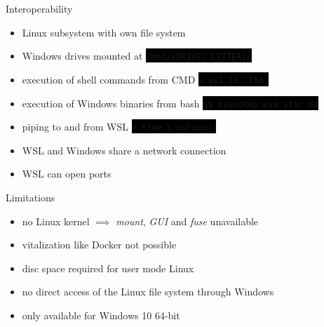 \documentclass[10pt,graphics,aspectratio=169,table]{beamer}
\newcommand{\code}[0]{\lstinline[basicstyle=\ttfamily\color{white}]}
\newcommand{\cbox}[1]{\colorbox{black}{#1}}
\begin{document}
\begin{frame}{Interoperability}
\begin{itemize}
    \item Linux subsystem with own file system
    \item Windows drives mounted at \cbox{\code|/mnt/[DRIVE\_LETTER]/|}
    \item execution of shell commands from CMD \cbox{\code|> wsl ls -lhA |}
    \item execution of Windows binaries from bash \cbox{\code|\$ nslookup.exe ifsr.de|}
    \item piping to and from WSL \cbox{\code|> tree \| wsl more|}
    \item WSL and Windows share a network connection
    \item WSL can open ports
\end{itemize}
\hfill\cite{interop}
\end{frame}

\begin{frame}{Limitations}
\begin{itemize}
    \item no Linux kernel $\implies$ \textit{mount}, \textit{GUI} and \textit{fuse} unavailable
    \item vitalization like Docker not possible
    \item disc space required for user mode Linux
    \item no direct access of the Linux file system through Windows
    \item only available for Windows 10 64-bit
\end{itemize}
\hfill\cite{wsl2}
\end{frame}
\end{document}
